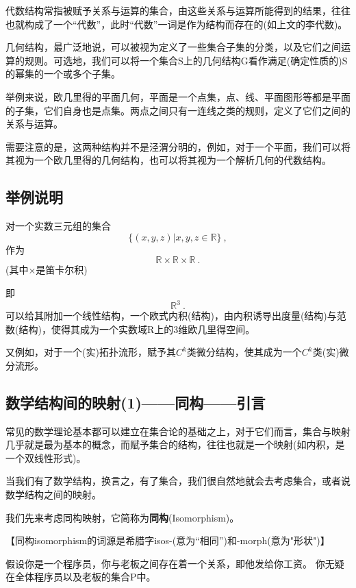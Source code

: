 代数结构常指被赋予关系与运算的集合，由这些关系与运算所能得到的结果，往往也就构成了一个“代数”，此时“代数”一词是作为结构而存在的(如上文的李代数)。

几何结构，最广泛地说，可以被视为定义了一些集合子集的分类，以及它们之间运算的规则。可选地，我们可以将一个集合S上的几何结构G看作满足(确定性质的)S的幂集的一个或多个子集。 

举例来说，欧几里得的平面几何，平面是一个点集，点、线、平面图形等都是平面的子集，它们自身也是点集。两点之间只有一连线之类的规则，定义了它们之间的关系与运算。

需要注意的是，这两种结构并不是泾渭分明的，例如，对于一个平面，我们可以将其视为一个欧几里得的几何结构，也可以将其视为一个解析几何的代数结构。

\subsection{举例说明}
对一个实数三元组的集合
\begin{equation}
\{(x,y,z)|x,y,z \in {\mathbb R} \}~,
\end{equation}
作为
\begin{equation}
{\mathbb R} \times {\mathbb R} \times {\mathbb R}~.
\end{equation}
(其中×是笛卡尔积)

即\begin{equation}
{\mathbb R}^3~.
\end{equation}
可以给其附加一个线性结构，一个欧式内积(结构)，由内积诱导出度量(结构)与范数(结构)，使得其成为一个实数域R上的3维欧几里得空间。 

又例如，对于一个(实)拓扑流形，赋予其$C^k$类微分结构，使其成为一个$C^k$类(实)微分流形。

\subsection{数学结构间的映射(1)——同构——引言}
常见的数学理论基本都可以建立在集合论的基础之上，对于它们而言，集合与映射几乎就是最为基本的概念，而赋予集合的结构，往往也就是一个映射(如内积，是一个双线性形式)。

当我们有了数学结构，换言之，有了集合，我们很自然地就会去考虑集合，或者说数学结构之间的映射。

我们先来考虑同构映射，它简称为\textbf{同构}(Isomorphism)。

【同构isomorphism的词源是希腊字isos-(意为“相同”)和-morph(意为"形状")】

假设你是一个程序员，你与老板之间存在着一个关系，即他发给你工资。
你无疑在全体程序员以及老板的集合P中。

